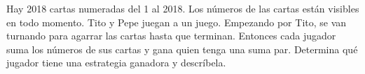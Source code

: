 Hay 2018 cartas numeradas del 1 al 2018. Los números de las cartas están visibles en todo momento. Tito y Pepe juegan a un juego. Empezando por Tito, se van turnando para agarrar las cartas hasta que terminan. Entonces cada jugador suma los números de sus cartas y gana quien tenga una suma par. Determina qué jugador tiene una estrategia ganadora y descríbela. 
